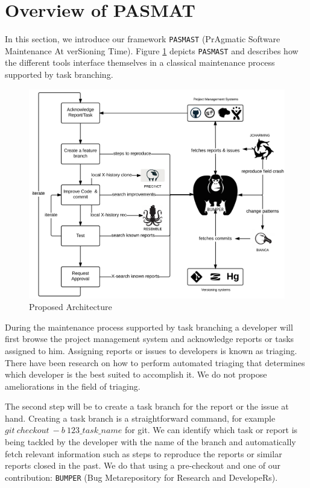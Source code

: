 \section{Overview of PASMAT\label{sec:overview}}

In this section, we introduce our framework {\tt PASMAST} (PrAgmatic Software Maintenance At verSioning Time).
Figure \ref{fig:proposal} depicts {\tt PASMAST} and describes how the different tools interface themselves in a classical maintenance process supported by task branching.

\begin{figure}[h!]
	\centering
	\includegraphics[scale=0.20]{media/proposal.png}
	\caption{Proposed Architecture}
	\label{fig:proposal}
\end{figure}

During the maintenance process supported by task branching a developer will first browse the project management system and acknowledge reports or tasks assigned to him.
Assigning reports or issues to developers is known as triaging.
There have been research on how to perform automated triaging that determines which developer is the best suited to accomplish it\cite{Saha2014, Tamrawi2011, Bortis2013}.
We do not propose ameliorations in the field of triaging.

The second step will be to create a task branch for the report or the issue at hand.
Creating a task branch is a straightforward command, for example $git~checkout~-b~123\_task\_name$ for git.
We can identify which task or report is being tackled by the developer with the name of the branch and automatically fetch relevant information such as steps to reproduce the reports or similar reports closed in the past.
We do that using a pre-checkout and one of our contribution: {\tt BUMPER} (Bug Metarepository for Research and DevelopeRs).

